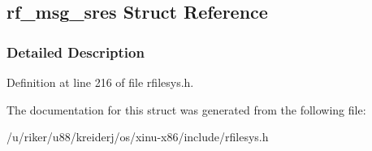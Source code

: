 \hypertarget{structrf__msg__sres}{}\subsection{rf\+\_\+msg\+\_\+sres Struct Reference}
\label{structrf__msg__sres}


\subsubsection{Detailed Description}


Definition at line 216 of file rfilesys.\+h.



The documentation for this struct was generated from the following file\+:\begin{DoxyCompactItemize}
\item 
/u/riker/u88/kreiderj/os/xinu-\/x86/include/rfilesys.\+h\end{DoxyCompactItemize}
